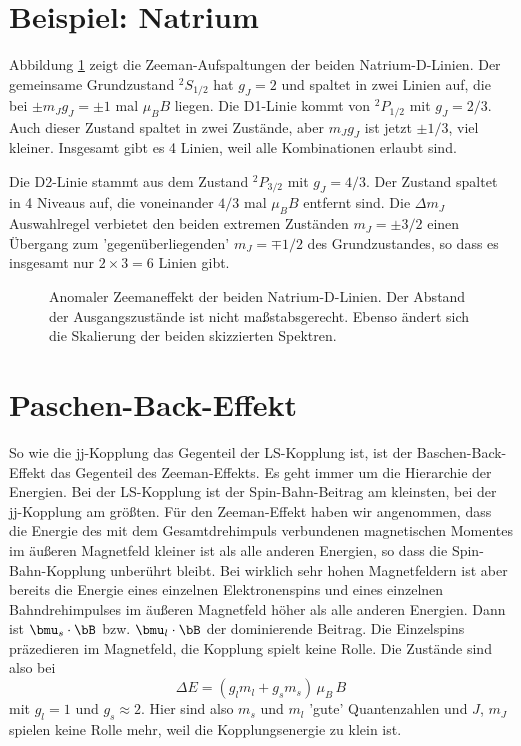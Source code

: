 \section{Beispiel: Natrium}

Abbildung \ref{fig:8_natrium_Bfeld} zeigt die Zeeman-Aufspaltungen der beiden Natrium-D-Linien. Der gemeinsame Grundzustand $^2S_{1/2}$ hat $g_J = 2$ und spaltet in zwei Linien auf, die bei $\pm m_J g_J = \pm 1$ mal $\mu_B B$ liegen. Die D1-Linie kommt von $^2P_{1/2}$ mit $g_J = 2/3$. Auch dieser Zustand spaltet in zwei Zustände, aber $m_J  g_J$ ist jetzt $\pm 1/3$, viel kleiner. Insgesamt gibt es 4 Linien, weil alle Kombinationen erlaubt sind.


Die D2-Linie stammt aus dem Zustand $^2P_{3/2}$ mit $g_J = 4/3$. Der Zustand spaltet in 4 Niveaus auf, die voneinander $4/3$ mal $\mu_B B$ entfernt sind. Die $\Delta m_J$ Auswahlregel verbietet den beiden extremen Zuständen $m_J = \pm 3/2$ einen Übergang zum 'gegenüberliegenden' $m_J = \mp 1/2$ des Grundzustandes, so dass es insgesamt nur $2 \times 3 = 6$ Linien gibt.


\begin{figure}
    \caption{Anomaler Zeemaneffekt der beiden Natrium-D-Linien. Der Abstand der Ausgangszustände ist nicht maßstabsgerecht. Ebenso ändert sich die Skalierung der beiden skizzierten Spektren.}
    \label{fig:8_natrium_Bfeld}
\end{figure}


\section{Paschen-Back-Effekt}

So wie die jj-Kopplung das Gegenteil der LS-Kopplung ist, ist der Baschen-Back-Effekt das Gegenteil des Zeeman-Effekts. Es geht immer um die Hierarchie der Energien. Bei der LS-Kopplung ist der Spin-Bahn-Beitrag am kleinsten, bei der jj-Kopplung am größten. Für den Zeeman-Effekt haben wir angenommen, dass die Energie des mit dem Gesamtdrehimpuls verbundenen magnetischen Momentes im äußeren Magnetfeld kleiner ist als alle anderen Energien, so dass die Spin-Bahn-Kopplung unberührt bleibt. Bei wirklich sehr hohen Magnetfeldern ist aber bereits die Energie eines einzelnen Elektronenspins und eines einzelnen Bahndrehimpulses im äußeren Magnetfeld höher als alle anderen Energien. Dann ist $ \bmu_s \cdot \bB$ bzw. $ \bmu_l \cdot \bB$ der dominierende Beitrag. Die Einzelspins präzedieren im Magnetfeld, die Kopplung spielt keine Rolle. Die Zustände sind also bei 
\begin{equation}
    \Delta E = \left( g_l m_l + g_s m_s \right) \, \mu_B \, B 
\end{equation}
mit $g_l = 1$ und $g_s \approx 2$. Hier sind also $m_s$ und $m_l$ 'gute' Quantenzahlen und $J$, $m_J$ spielen keine Rolle mehr, weil die Kopplungsenergie zu klein ist.

